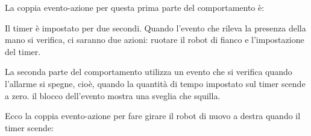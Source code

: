 \newpage
La coppia evento-azione per questa prima parte del comportamento è:

Il timer è impostato per due secondi. Quando l'evento che rileva la presenza della mano
si verifica, ci saranno due azioni: ruotare il robot di fianco
e l'impostazione del timer.

La seconda parte del comportamento utilizza un evento che si verifica quando l'allarme si spegne,
cioè, quando la quantità di tempo impostato sul timer scende a zero. il blocco dell'evento
  mostra una sveglia che squilla.

Ecco la coppia evento-azione per fare girare il robot di nuovo a
destra quando il timer scende: 

